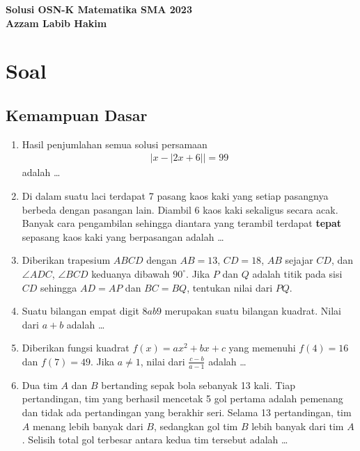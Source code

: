 \begin{center}
    \textbf{\Huge Solusi OSN-K Matematika SMA 2023}\\
    \textbf{\large Azzam Labib Hakim}
\end{center}

%
\vspace{-1.5cm}
\section{Soal}
\subsection{Kemampuan Dasar}
\begin{enumerate}
\item Hasil penjumlahan semua solusi persamaan
\begin{align*}
|x-|2x+6||=99
\end{align*}
adalah \dots

\item Di dalam suatu laci terdapat 7 pasang kaos kaki yang setiap pasangnya berbeda dengan pasangan lain. Diambil 6 kaos kaki sekaligus secara acak. Banyak cara pengambilan sehingga diantara yang terambil terdapat \textbf{tepat} sepasang kaos kaki yang berpasangan adalah \dots

\item Diberikan trapesium $ABCD$ dengan $AB = 13$, $CD = 18$, $AB$ sejajar $CD$,
dan $\angle ADC$, $\angle BCD$ keduanya dibawah $90^\circ$. Jika $P$ dan $Q$ adalah titik pada sisi $CD$ sehingga $AD = AP$ dan $BC = BQ$, tentukan nilai dari $PQ$.

\item Suatu bilangan empat digit $8ab9$ merupakan suatu bilangan kuadrat. Nilai dari $a+b$ adalah \dots

\item Diberikan fungsi kuadrat  $f(x) = ax^2+bx+c$ yang memenuhi $f(4)=16$ dan $f(7)=49$. Jika $a \neq 1$, nilai dari $\frac{c-b}{a-1}$ adalah \dots

\item Dua tim $A$ dan $B$ bertanding sepak bola sebanyak 13 kali. Tiap pertandingan, tim yang berhasil mencetak 5 gol pertama adalah pemenang dan tidak ada pertandingan yang berakhir seri. Selama 13 pertandingan, tim $A$ menang lebih banyak dari $B$, sedangkan gol tim $B$ lebih banyak dari tim $A$. Selisih total gol terbesar antara kedua tim tersebut adalah \dots


\end{enumerate}
